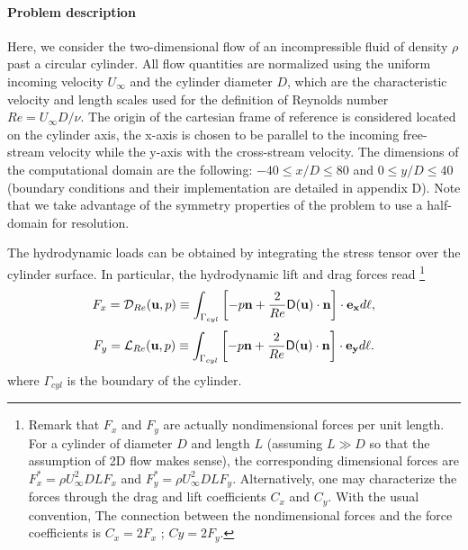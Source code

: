 \documentclass[twocolumn,10pt]{asme2ej}
\newcommand{\be}[1]{ \begin{equation} \label{#1}}
\newcommand{\ee}{\end{equation}}
\begin{document}
\paragraph{Problem description}
Here, we consider the two-dimensional flow of an incompressible fluid of density $\rho$ past a circular cylinder. 
All flow quantities are normalized using the uniform incoming velocity $U_{\infty}$ and the cylinder diameter $D$, 
which are the characteristic velocity and length scales used for the definition of Reynolds number $Re= U_{\infty} D / \nu$.
The origin of the cartesian frame of reference is considered located on the cylinder axis, the x-axis is chosen to be parallel to 
the incoming free-stream velocity while the y-axis with the cross-stream velocity. 
The dimensions of the computational domain are the following: $-40 \le x/D \le 80$ and $0 \le y/D \le 40$ (boundary conditions and their implementation are detailed in appendix D).
Note that we take advantage of the symmetry properties of the problem to use a half-domain for resolution. 

The hydrodynamic loads can be obtained by integrating the stress tensor over the cylinder surface.
In particular, the hydrodynamic lift and drag forces read
\footnote{ Remark that $F_x$ and $F_y$ are actually nondimensional forces per unit length. 
For a cylinder of diameter $D$ and length $L$ (assuming $L\gg D$ so that the assumption of 2D flow makes sense), 
the corresponding dimensional forces are $F_x^* = \rho U_\infty^2 D L F_x $ and $F_y^* = \rho U_\infty^2 D L F_y$. 
Alternatively, one may characterize the forces through the drag and lift coefficients $C_x$ and $C_y$. With the usual convention, 
The connection between the nondimensional forces and the force coefficients is $C_x = 2 F_x$ ; $Cy = 2 F_y$.
}
\be{drag}
F_x = {\cal D}_{Re} ({\bf u},p) \equiv 
  \int_{\Gamma_{cyl}} \left[-p {\bf n} + \frac{2}{Re} {\mathsf{D}}({\bf u}) \cdot {\bf n} \right]   \cdot {\bf e_x} d\ell,
\ee
\be{lift}
F_y = {\cal L}_{Re} ({\bf u},p) \equiv
  \int_{\Gamma_{cyl}} \left[-p {\bf n} + \frac{2}{Re} {\mathsf{D}}({\bf u}) \cdot {\bf n} \right]   \cdot {\bf e_y} d\ell. 
\ee
where $\Gamma_{cyl}$ is the boundary of the cylinder. %
\end{document}

